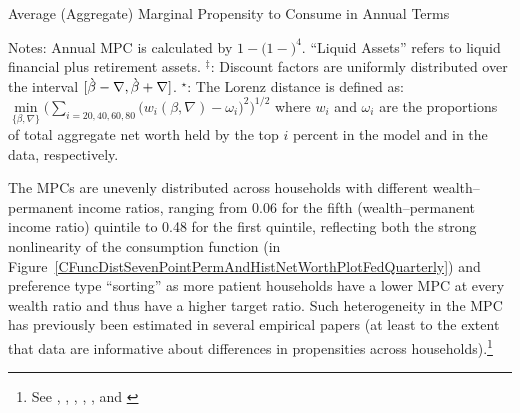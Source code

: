\documentclass[12pt,titlepage]{econtex}
\begin{document}
% 

\begin{table}
\caption{Average (Aggregate) Marginal Propensity to Consume in Annual Terms}
\label{table:MPCall}
\begin{minipage}{\textwidth}

{\footnotesize Notes: Annual MPC is calculated by $1-(1-$$)^{4}$.  ``Liquid Assets'' refers to liquid financial plus retirement assets. ${}^\ddagger$: Discount factors are uniformly distributed over the interval $[\grave{\beta}-\nabla,\grave{\beta}+\nabla]$.  ${}^\star$: The Lorenz distance is defined as: $\underset{\{{\beta}, \nabla\}}{\min} \Big(\sum_{i=20, 40, 60, 80}\big(w_{i}({\beta},\nabla)-\omega_{i}\big)^{2}\Big)^{1/2}$ where $w_{i}$ and $\omega_{i}$ are the proportions of total aggregate net worth held by the top $i$ percent in the model and in the data, respectively.  }
\end{minipage}
\end{table}


%
%
%
%
%


The MPCs are unevenly distributed across households with different wealth--permanent income ratios, ranging from 0.06 for the fifth (wealth--permanent income ratio) quintile to 0.48 for the first quintile, reflecting both the strong nonlinearity of the consumption function (in Figure~\ref{CFuncDistSevenPointPermAndHistNetWorthPlotFedQuarterly}) and preference type ``sorting'' as more patient households have a lower MPC at every wealth ratio and thus have a higher target ratio. Such heterogeneity in the MPC has previously been estimated in several empirical papers (at least to the extent that data are informative about differences in propensities across households).\footnote{%
See  \citet{bppInequality}, \citet{brodaParker:stimulus2008}, \citet{leth-petersen:liquidity}, \citet{jappelliPistaferri_FPMPC}, \citet{jpsTax}, \citet{aslCredit} and  \citet{bps:familyLaborS}}
\end{document}
